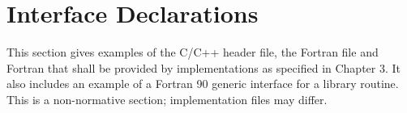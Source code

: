%
%
%
%
%
%
%
%
%
%
%
%
%



\chapter{Interface Declarations}
\label{chap:Interface Declarations}
This section gives examples of the C/C++ header file, the Fortran  file and
Fortran  that shall be provided by implementations as specified in Chapter 3. It
also includes an example of a Fortran 90 generic interface for a library routine. This is a
non-normative section; implementation files may differ.




